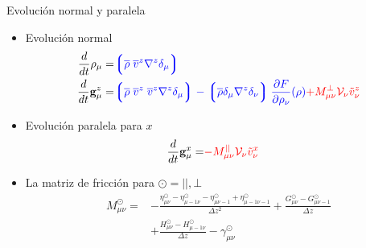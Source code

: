 \documentclass{beamer}
\newcommand{\llg}{\left\lgroup}
\newcommand{\rlg}{\right\rgroup}
\begin{document}
\begin{frame}{Evolución normal y paralela}
\begin{itemize}
  \item<1-> Evolución normal 
\begin{align}
  \frac{d}{dt}\rho_\mu=&  {\color{blue} \llg\overline{\rho} \; \overline{v}^{z}{\nabla}^{z}\delta_\mu \rlg}
\nonumber\\
    \frac{d}{dt}{{\bf g}}^{z}_\mu=&
{\color{blue} \llg\overline{\rho}\; \overline{v}^{z}\;\overline{v}^{z}{\nabla}^{z}\delta_{\mu}\rlg
-\llg\overline{\rho}\delta_{\mu}{\nabla}^{z}\delta_{\nu}\rlg
\frac{\partial  F}{\partial \rho_{\nu}}(\rho)}
{\color{red} +M_{\mu\nu}^{\bot}{\cal V}_\nu\tilde{v}^{z}_\nu}
\nonumber
\end{align}
  \item<2-> Evolución paralela para $x$  
\begin{align}
  \frac{d}{dt}{{\bf g}}^x_\mu=&{\color{red}-M_{\mu\nu}^{||}{\cal V}_\nu\tilde{v}^x_\nu}
\nonumber
\end{align}
\item<3-> La matriz de fricción para $\odot=||,\bot$
\begin{align}
M^{\odot}_{\mu\nu} 
=&-\frac{\eta^{\odot}_{\mu\nu}-\eta^{\odot}_{\mu-1\nu}-\eta^{\odot}_{\mu\nu-1}+\eta^{\odot}_{\mu-1\nu-1}}{\Delta z^2}
+\frac{{G}^{\odot}_{\mu\nu}-{G}^{\odot}_{\mu\nu-1}}{\Delta z} \nonumber \\
&+\frac{{H}^{\odot}_{\mu\nu}-{H}^{\odot}_{\mu-1\nu}}{\Delta z}
-{\gamma}^{\odot}_{\mu\nu}
\nonumber
\end{align}
\end{itemize}
\end{frame}
\end{document}
